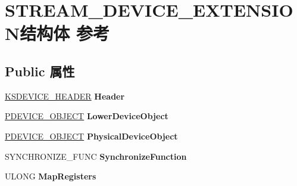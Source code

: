 \hypertarget{struct_s_t_r_e_a_m___d_e_v_i_c_e___e_x_t_e_n_s_i_o_n}{}\section{S\+T\+R\+E\+A\+M\+\_\+\+D\+E\+V\+I\+C\+E\+\_\+\+E\+X\+T\+E\+N\+S\+I\+O\+N结构体 参考}
\label{struct_s_t_r_e_a_m___d_e_v_i_c_e___e_x_t_e_n_s_i_o_n}
\subsection*{Public 属性}
\begin{DoxyCompactItemize}
\item 
\mbox{\label{struct_s_t_r_e_a_m___d_e_v_i_c_e___e_x_t_e_n_s_i_o_n_a308b518f2b18f432ed074ba8a716c0db}} 
\hyperlink{interfacevoid}{K\+S\+D\+E\+V\+I\+C\+E\+\_\+\+H\+E\+A\+D\+ER} {\bfseries Header}
\item 
\mbox{\label{struct_s_t_r_e_a_m___d_e_v_i_c_e___e_x_t_e_n_s_i_o_n_aa974f96d78570c26333f2e386c7ee367}} 
\hyperlink{struct___d_e_v_i_c_e___o_b_j_e_c_t}{P\+D\+E\+V\+I\+C\+E\+\_\+\+O\+B\+J\+E\+CT} {\bfseries Lower\+Device\+Object}
\item 
\mbox{\label{struct_s_t_r_e_a_m___d_e_v_i_c_e___e_x_t_e_n_s_i_o_n_a3e1c2b1af2237d355b2f99e184bc2786}} 
\hyperlink{struct___d_e_v_i_c_e___o_b_j_e_c_t}{P\+D\+E\+V\+I\+C\+E\+\_\+\+O\+B\+J\+E\+CT} {\bfseries Physical\+Device\+Object}
\item 
\mbox{\label{struct_s_t_r_e_a_m___d_e_v_i_c_e___e_x_t_e_n_s_i_o_n_ac93891874239ef9998463d3f3d7794ed}} 
S\+Y\+N\+C\+H\+R\+O\+N\+I\+Z\+E\+\_\+\+F\+U\+NC {\bfseries Synchronize\+Function}
\item 
\mbox{\label{struct_s_t_r_e_a_m___d_e_v_i_c_e___e_x_t_e_n_s_i_o_n_a9e057f11a0fdac8f2a189f3a18d79e6c}} 
U\+L\+O\+NG {\bfseries Map\+Registers}
\item 
\mbox{\label{struct_s_t_r_e_a_m___d_e_v_i_c_e___e_x_t_e_n_s_i_o_n_a8247f9086a79b208325d890ed10dbd5b}} 

\end{DoxyCompactItemize}
